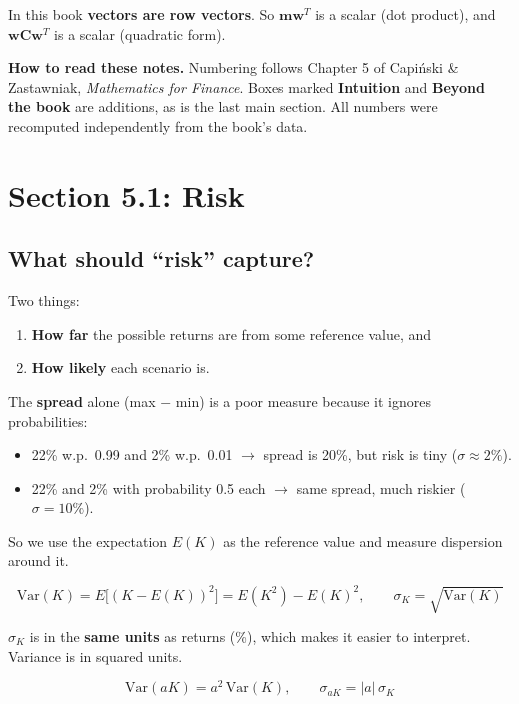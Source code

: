 \documentclass[titlepage,11pt,a4paper]{article}
\newcommand{\Var}{\mathrm{Var}}
\newcommand{\E}{E}
\newcommand{\vw}{\boldsymbol{w}}
\newcommand{\vm}{\boldsymbol{m}}
\newcommand{\vC}{\boldsymbol{C}}
\newcommand{\T}{^{T}}
\begin{document}
In this book \textbf{vectors are row vectors}. So $\vm\vw\T$ is a scalar (dot product), and $\vw\vC\vw\T$ is a scalar (quadratic form).

\textbf{How to read these notes.} Numbering follows Chapter 5 of Capi\'nski \& Zastawniak, \emph{Mathematics for Finance}. Boxes marked \textbf{Intuition} and \textbf{Beyond the book} are additions, as is the last main section. All numbers were recomputed independently from the book's data.

\section{Section 5.1: Risk}

\subsection{What should ``risk'' capture?}
Two things:
\begin{enumerate}
  \item \textbf{How far} the possible returns are from some reference value, and
  \item \textbf{How likely} each scenario is.
\end{enumerate}
The \textbf{spread} alone (max $-$ min) is a poor measure because it ignores probabilities:
\begin{itemize}
  \item 22\% w.p.\ 0.99 and 2\% w.p.\ 0.01 $\to$ spread is 20\%, but risk is tiny ($\sigma\approx2\%$).
  \item 22\% and 2\% with probability 0.5 each $\to$ same spread, much riskier ($\sigma=10\%$).
\end{itemize}
So we use the expectation $\E(K)$ as the reference value and measure dispersion around it.

\begin{result}
\[\Var(K)=\E\big[(K-\E(K))^2\big]=\E(K^2)-\E(K)^2,\qquad \sigma_K=\sqrt{\Var(K)}\]
\end{result}

$\sigma_K$ is in the \textbf{same units} as returns (\%), which makes it easier to interpret. Variance is in squared units.

\begin{result}
\[\Var(aK)=a^2\,\Var(K),\qquad \sigma_{aK}=|a|\,\sigma_K\]
\end{result}
\end{document}
